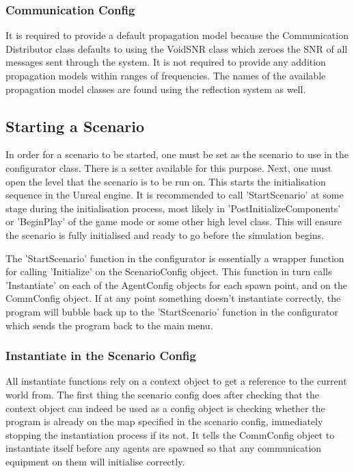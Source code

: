 \documentclass[../main.tex]{subfiles}
\begin{document}
\subsubsection{Communication Config}
It is required to provide a default propagation model because the Communication Distributor class defaults to using the VoidSNR class which zeroes the SNR of all messages sent through the system.
It is not required to provide any addition propagation models within ranges of frequencies.
The names of the available propagation model classes are found using the reflection system as well.

\subsection{Starting a Scenario}
In order for a scenario to be started, one must be set as the scenario to use in the configurator class.
There is a setter available for this purpose.
Next, one must open the level that the scenario is to be run on.
This starts the initialisation sequence in the Unreal engine.
It is recommended to call 'StartScenario' at some stage during the initialisation process, most likely in 'PostInitializeComponents' or 'BeginPlay' of the game mode or some other high level class.
This will ensure the scenario is fully initialised and ready to go before the simulation begins.

The 'StartScenario' function in the configurator is essentially a wrapper function for calling 'Initialize' on the ScenarioConfig object.
This function in turn calls 'Instantiate' on each of the AgentConfig objects for each spawn point, and on the CommConfig object.
If at any point something doesn't instantiate correctly, the program will bubble back up to the 'StartScenario' function in the configurator which sends the program back to the main menu.

\subsubsection{Instantiate in the Scenario Config}
All instantiate functions rely on a context object to get a reference to the current world from.
The first thing the scenario config does after checking that the context object can indeed be used as a config object is checking whether the program is already on the map specified in the scenario config, immediately stopping the instantiation process if its not.
It tells the CommConfig object to instantiate itself before any agents are spawned so that any communication equipment on them will initialise correctly.
\end{document}
